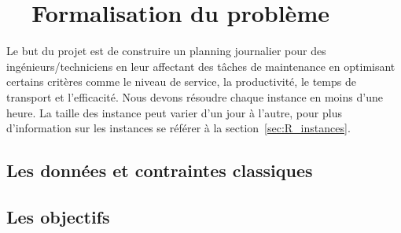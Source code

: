 



\chapter{~~Formalisation du problème \label{Chap:Form}}


Le but du projet est de construire un planning journalier pour des ingénieurs/techniciens en leur affectant des tâches de maintenance en optimisant certains critères comme le niveau de service, la productivité, le temps de transport et l'efficacité. Nous devons résoudre chaque instance en moins d'une heure.
La taille des instance peut varier d'un jour à l'autre, pour plus d'information sur les instances se référer à la section~\ref{sec:R_instances}. 


\section{Les données et contraintes classiques \label{sec:F_DataCons}}




\section{Les objectifs \label{sec:F_Objectifs}}





